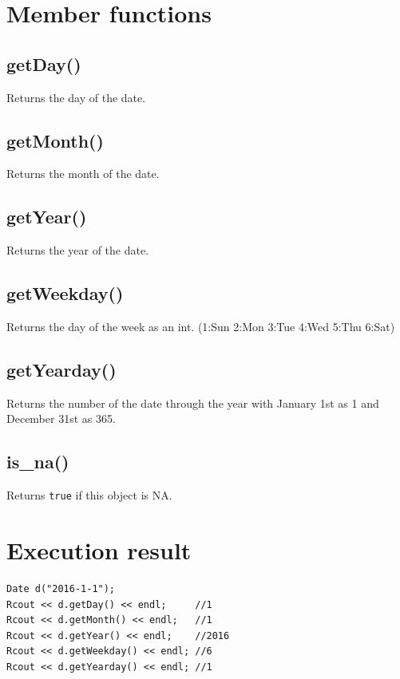 \documentclass[]{book}
\theoremstyle{definition}
\theoremstyle{definition}
\theoremstyle{remark}
\begin{document}
\section{Member functions}\label{member-functions-5}

\subsection{getDay()}\label{getday}

Returns the day of the date.

\subsection{getMonth()}\label{getmonth}

Returns the month of the date.

\subsection{getYear()}\label{getyear}

Returns the year of the date.

\subsection{getWeekday()}\label{getweekday}

Returns the day of the week as an int. (1:Sun 2:Mon 3:Tue 4:Wed 5:Thu
6:Sat)

\subsection{getYearday()}\label{getyearday}

Returns the number of the date through the year with January 1st as 1
and December 31st as 365.

\subsection{is\_na()}\label{is_na}

Returns \texttt{true} if this object is NA.

\section{Execution result}\label{execution-result}

\begin{verbatim}
Date d("2016-1-1");
Rcout << d.getDay() << endl;     //1
Rcout << d.getMonth() << endl;   //1
Rcout << d.getYear() << endl;    //2016
Rcout << d.getWeekday() << endl; //6
Rcout << d.getYearday() << endl; //1
\end{verbatim}
\end{document}
